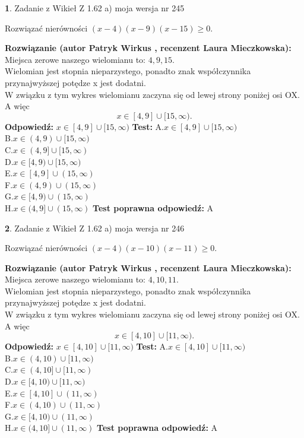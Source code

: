 \documentclass[12pt, a4paper]{article}
\theoremstyle{definition} %
\newtheorem{zad}{}
\newcommand{\zadStart}[1]{\begin{zad}#1\newline}
\newcommand{\zadStop}{\end{zad}}
\newcommand{\rozwStart}[2]{\noindent \textbf{Rozwiązanie (autor #1 , recenzent #2): }\newline}
\newcommand{\rozwStop}{\newline}
\newcommand{\odpStart}{\noindent \textbf{Odpowiedź:}\newline}
\newcommand{\odpStop}{\newline}
\newcommand{\testStart}{\noindent \textbf{Test:}\newline}
\newcommand{\testStop}{\newline}
\newcommand{\kluczStart}{\noindent \textbf{Test poprawna odpowiedź:}\newline}
\newcommand{\kluczStop}{\newline}
\begin{document}
\zadStart{Zadanie z Wikieł Z 1.62 a) moja wersja nr 245}

Rozwiązać nierówności $(x-4)(x-9)(x-15)\ge0$.
\zadStop
\rozwStart{Patryk Wirkus}{Laura Mieczkowska}
Miejsca zerowe naszego wielomianu to: $4, 9, 15$.\\
Wielomian jest stopnia nieparzystego, ponadto znak współczynnika przy\linebreak najwyższej potędze x jest dodatni.\\ W związku z tym wykres wielomianu zaczyna się od lewej strony poniżej osi OX. A więc $$x \in [4,9] \cup [15,\infty).$$
\rozwStop
\odpStart
$x \in [4,9] \cup [15,\infty)$
\odpStop
\testStart
A.$x \in [4,9] \cup [15,\infty)$\\
B.$x \in (4,9) \cup [15,\infty)$\\
C.$x \in (4,9] \cup [15,\infty)$\\
D.$x \in [4,9) \cup [15,\infty)$\\
E.$x \in [4,9] \cup (15,\infty)$\\
F.$x \in (4,9) \cup (15,\infty)$\\
G.$x \in [4,9) \cup (15,\infty)$\\
H.$x \in (4,9] \cup (15,\infty)$
\testStop
\kluczStart
A
\kluczStop



\zadStart{Zadanie z Wikieł Z 1.62 a) moja wersja nr 246}

Rozwiązać nierówności $(x-4)(x-10)(x-11)\ge0$.
\zadStop
\rozwStart{Patryk Wirkus}{Laura Mieczkowska}
Miejsca zerowe naszego wielomianu to: $4, 10, 11$.\\
Wielomian jest stopnia nieparzystego, ponadto znak współczynnika przy\linebreak najwyższej potędze x jest dodatni.\\ W związku z tym wykres wielomianu zaczyna się od lewej strony poniżej osi OX. A więc $$x \in [4,10] \cup [11,\infty).$$
\rozwStop
\odpStart
$x \in [4,10] \cup [11,\infty)$
\odpStop
\testStart
A.$x \in [4,10] \cup [11,\infty)$\\
B.$x \in (4,10) \cup [11,\infty)$\\
C.$x \in (4,10] \cup [11,\infty)$\\
D.$x \in [4,10) \cup [11,\infty)$\\
E.$x \in [4,10] \cup (11,\infty)$\\
F.$x \in (4,10) \cup (11,\infty)$\\
G.$x \in [4,10) \cup (11,\infty)$\\
H.$x \in (4,10] \cup (11,\infty)$
\testStop
\kluczStart
A
\kluczStop
\end{document}
